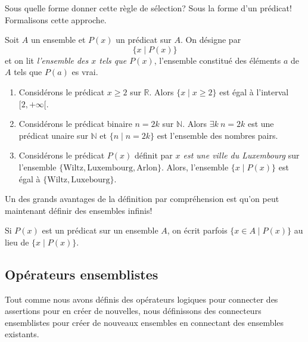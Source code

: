 \documentclass[french,course,oneside,theoremnosection]{lecture}
\newcommand{\R}{\mathbb{R}}
\newcommand{\N}{\mathbb{N}}
\begin{document}
Sous quelle forme donner cette règle de sélection? Sous la forme d'un prédicat! Formalisons cette approche.

\begin{definition}
Soit $A$ un ensemble et $P(x)$ un prédicat sur $A$. On désigne par
\[
\{x \mid P(x)\}
\]
et on lit \emph{l'ensemble des $x$ tels que $P(x)$}, l'ensemble constitué des éléments $a$ de $A$ tels que $P(a)$ es vrai.
\end{definition}

\begin{example}
\begin{enumerate}[(1)]
\item Considérons le prédicat $x\geq 2$ sur $\R$. Alors $\{x \mid x\geq 2\}$ est égal à l'interval $[2, +\infty[$.
\item Considérons le prédicat binaire $n=2k$ sur $\N$. Alors $\exists k \ n=2k$ est une prédicat unaire sur $\N$ et $\{n \mid n=2k\}$ est l'ensemble des nombres pairs.
\item Considérons le prédicat $P(x)$ définit par \emph{$x$ est une ville du Luxembourg} sur l'ensemble $\{\text{Wiltz}, \text{Luxembourg}, \text{Arlon}\}$. Alors, l'ensemble $\{x \mid P(x)\}$ est égal à $\{\text{Wiltz}, \text{Luxebourg}\}$.
\end{enumerate}
\end{example}

Un des grands avantages de la définition par compréhension est qu'on peut maintenant définir des ensembles infinis!

\begin{notation}
Si $P(x)$ est un prédicat sur un ensemble $A$, on écrit parfois $\{x \in A \mid P(x)\}$ au lieu de $\{x \mid P(x)\}$.
\end{notation}

\subsection{Opérateurs ensemblistes}
Tout comme nous avons définis des opérateurs logiques pour connecter des assertions pour en créer de nouvelles, nous définissons des connecteurs ensemblistes pour créer de nouveaux ensembles en connectant des ensembles existants.
\end{document}
